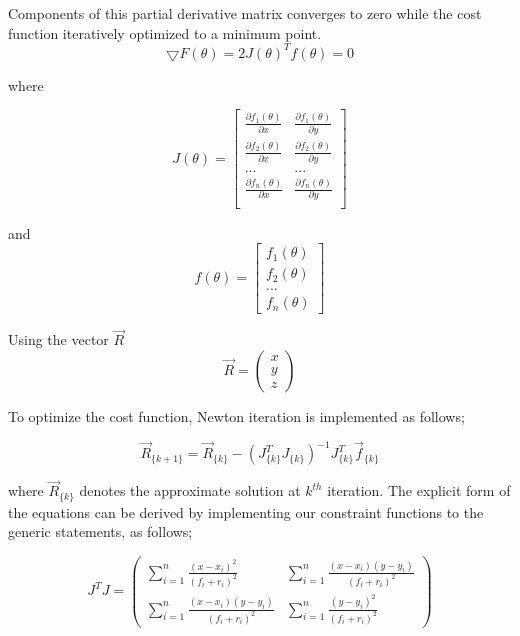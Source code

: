 Components of this partial derivative matrix converges to zero while the cost function iteratively optimized to a minimum point. 
\begin{equation}
\bigtriangledown{F(\theta)} = 2J(\theta)^Tf(\theta) = 0
\end{equation}

where

\begin{equation}
J(\theta) = \begin{bmatrix}
\frac{\partial{f_1(\theta)}}{\partial{x}} & \frac{\partial{f_1(\theta)}}{\partial{y}} \\
\frac{\partial{f_2(\theta)}}{\partial{x}} & \frac{\partial{f_2(\theta)}}{\partial{y}} \\
... & ... \\
\frac{\partial{f_n(\theta)}}{\partial{x}} & \frac{\partial{f_n(\theta)}}{\partial{y}} \\
\end{bmatrix}
\end{equation}

and 
\begin{equation}
f(\theta) = \begin{bmatrix}
f_1(\theta) \\
f_2(\theta) \\
...         \\
f_n(\theta)
\end{bmatrix}
\end{equation}
	
Using the vector $\vec{R}$	
\begin{equation}
 \vec{R} = \left(\begin{matrix}
  x \\ y \\ z
 \end{matrix}\right)
\end{equation}

To optimize the cost function, Newton iteration is implemented as follows;

\begin{equation}
 \vec{R}_{\{k+1\}} =  \vec{R}_{\{k\}} - (J^T_{\{k\}}J_{\{k\}})^{-1}J^T_{\{k\}}\vec{f}_{\{k\}}
\end{equation}	

where $\vec{R}_{\{k\}}$ denotes the approximate solution at $k^{th}$ iteration. The explicit form of the equations can be derived  by implementing our constraint functions to the generic statements, as follows;
	
\begin{equation}
J^TJ = \left(\begin{matrix}
\sum_{i=1}^{n} \frac{(x-x_i)^2}{(f_i+r_i)^2} &  \sum_{i=1}^{n} \frac{(x-x_i)(y-y_i)}{(f_i+r_i)^2} \\
\sum_{i=1}^{n} \frac{(x-x_i)(y-y_i)}{(f_i+r_i)^2} &  \sum_{i=1}^{n} \frac{(y-y_i)^2}{(f_i+r_i)^2}
\end{matrix}\right)
\end{equation}	

